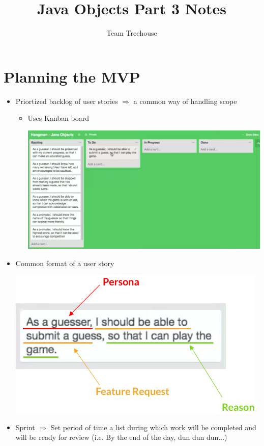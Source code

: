 \documentclass[12pt]{article}
\begin{document}
\title{Java Objects Part 3 Notes}
\author{Team Treehouse}
\maketitle

\section{Planning the MVP}

\begin{itemize}

    \item Priortized backlog of user stories $\Rightarrow$ a common way of handling scope
    \begin{itemize}
        \item Uses Kanban board

        \begin{center}
        \includegraphics[width=\linewidth]{images/part_3_notes_1.png}
        \end{center}
    \end{itemize}

    \item Common format of a user story
    \begin{center}
    \includegraphics[width=0.65\linewidth]{images/part_3_notes_2.png}
    \end{center}
    \item Sprint $\Rightarrow$ Set period of time a list during which work
    will be completed and will be ready for review (i.e. By the end of the day,
    dun dun dun...)


\end{itemize}
\end{document}
